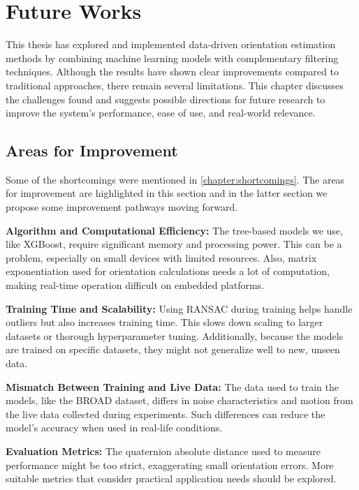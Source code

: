 \documentclass{iutbscthesis}
\begin{document}
\chapter{Future Works} \label{chapter:futureWorks}

This thesis has explored and implemented data-driven orientation estimation methods by combining machine learning models with complementary filtering techniques. Although the results have shown clear improvements compared to traditional approaches, there remain several limitations. This chapter discusses the challenges found and suggests possible directions for future research to improve the system’s performance, ease of use, and real-world relevance.

\section{Areas for Improvement}

Some of the shortcomings were mentioned in \autoref{chapter:shortcomings}. The areas for improvement are highlighted in this section and in the latter section we propose some improvement pathways moving forward.

\textbf{Algorithm and Computational Efficiency:}  
The tree-based models we use, like XGBoost, require significant memory and processing power. This can be a problem, especially on small devices with limited resources. Also, matrix exponentiation used for orientation calculations needs a lot of computation, making real-time operation difficult on embedded platforms.

\textbf{Training Time and Scalability:}  
Using RANSAC during training helps handle outliers but also increases training time. This slows down scaling to larger datasets or thorough hyperparameter tuning. Additionally, because the models are trained on specific datasets, they might not generalize well to new, unseen data.

\textbf{Mismatch Between Training and Live Data:}  
The data used to train the models, like the BROAD dataset, differs in noise characteristics and motion from the live data collected during experiments. Such differences can reduce the model’s accuracy when used in real-life conditions.

\textbf{Evaluation Metrics:}  
The quaternion absolute distance used to measure performance might be too strict, exaggerating small orientation errors. More suitable metrics that consider practical application needs should be explored.
\end{document}
